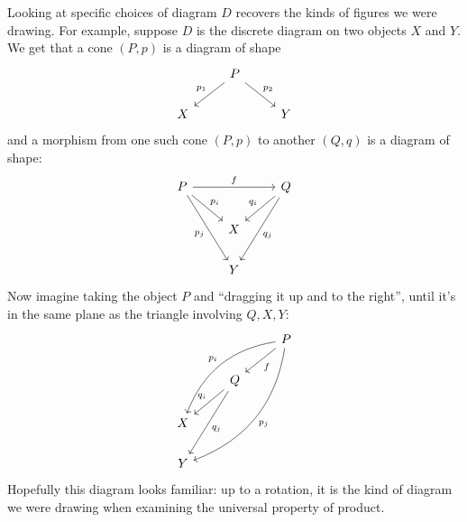 Looking at specific choices of diagram \(D\) recovers the kinds of figures we were drawing.
For example, suppose
\(D\) is the discrete diagram on two objects \(X\) and \(Y\). We get that
  a cone \((P,p)\) is a diagram of shape \[%
\begin{tikzcd}
  & P \arrow[ld, "p_1"'] \arrow[rd, "p_2"] &   \\
X &                                        & Y
\end{tikzcd}\]
and a morphism from one such cone \((P,p)\) to another \((Q,q)\)
is a diagram of shape:
\[%
\begin{tikzcd}
P \arrow[rr, "f"] \arrow[rd, "p_i"] \arrow[rdd, "p_j"'] &   & Q \arrow[ld, "q_i"'] \arrow[ldd, "q_j"] \\
                                                        & X &                                         \\
                                                        & Y &
\end{tikzcd}\]
Now imagine taking the object \(P\) and ``dragging it up and to the right'', until it's in the same plane
as the triangle involving \(Q,X,Y\):
\[%
\begin{tikzcd}
  &                                         & P \arrow[ld, "f"] \arrow[lldd, "p_i"', bend right] \arrow[llddd, "p_j", bend left] \\
  & Q \arrow[ld, "q_i"'] \arrow[ldd, "q_j"] &                                                                                    \\
X &                                         &                                                                                    \\
Y &                                         &
\end{tikzcd}\]
Hopefully this diagram looks familiar: up to a rotation, it is the kind of diagram we were drawing when examining
the universal property of product.

